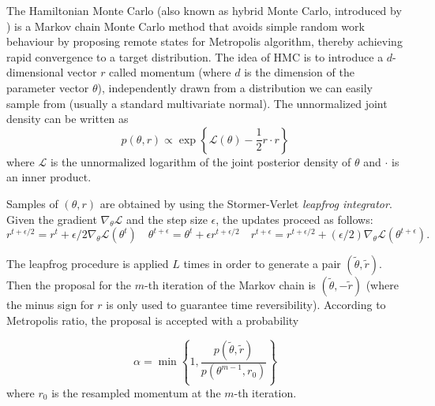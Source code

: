 \documentclass{article}
\begin{document}
The Hamiltonian Monte Carlo (also known as hybrid Monte Carlo, introduced by \citealp{duane1987hybrid}) is a Markov chain Monte Carlo method that avoids simple random work behaviour by proposing remote states for Metropolis algorithm, thereby achieving rapid convergence to a target distribution.
The idea of HMC is to introduce a $d$-dimensional vector $r$ called momentum (where $d$ is the dimension of the parameter vector $\theta$), independently drawn from a distribution we can easily sample from (usually a standard multivariate normal). The unnormalized joint density can be written as
$$ p(\theta,r) \propto \exp\left\{\mathcal{L}(\theta)-\frac{1}{2} r \cdot r\right\} $$
where $\mathcal{L}$ is the unnormalized logarithm of the joint posterior density of $\theta$ and $\cdot$ is an inner product.

\par Samples of $(\theta,r)$ are obtained by using the Stormer-Verlet \textit{leapfrog integrator}. Given the gradient $\nabla_{\theta}\mathcal{L}$ and the step size $\epsilon$, the updates proceed as follows:
\begin{equation*}
r^{t+\epsilon/2}=r^t+\epsilon/2 \nabla_{\theta}\mathcal{L}(\theta^t)
\quad \theta^{t+\epsilon} = \theta^t+\epsilon r^{t+\epsilon/2} \quad
r^{t+\epsilon}=r^{t+\epsilon/2}+(\epsilon/2)\nabla_{\theta}\mathcal{L}(\theta^{t+\epsilon}).
\end{equation*}

\par The leapfrog procedure is applied $L$ times in order to generate a pair $(\tilde{\theta},\tilde{r})$. Then the proposal for the $m$-th iteration of the Markov chain is $(\tilde{\theta},-\tilde{r})$ (where the minus sign for $r$ is only used to guarantee time reversibility). According to Metropolis ratio, the proposal is accepted %
with a probability

\begin{equation*}
\alpha=\min\left\{1,\frac{p(\tilde{\theta},\tilde{r})}{p(\theta^{m-1},r_0)}\right\}
\end{equation*}
\noindent where $r_0$ is the resampled momentum at the $m$-th iteration.
\end{document}
